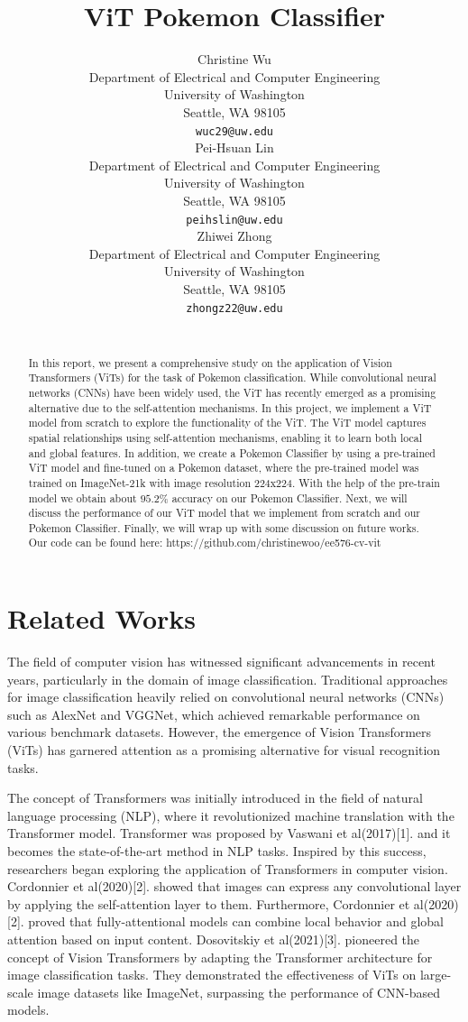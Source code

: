 \documentclass{article} %
\title{ViT Pokemon Classifier}
\author{
Christine Wu\\
Department of Electrical and Computer Engineering\\
University of Washington\\
Seattle, WA 98105 \\
\texttt{wuc29@uw.edu} \\
\And
Pei-Hsuan Lin \\
Department of Electrical and Computer Engineering\\
University of Washington\\
Seattle, WA 98105 \\
\texttt{peihslin@uw.edu} \\
\AND
Zhiwei Zhong \\
Department of Electrical and Computer Engineering\\
University of Washington\\
Seattle, WA 98105 \\
\texttt{zhongz22@uw.edu} \\
\\
}
\begin{document}
\maketitle

\begin{abstract}
In this report, we present a comprehensive study on the application of Vision Transformers 
(ViTs) for the task of Pokemon classification. While convolutional neural networks (CNNs) 
have been widely used, the ViT has recently emerged as a promising alternative due to the 
self-attention mechanisms. In this project, we implement a ViT model from scratch to explore
the functionality of the ViT. The ViT model captures spatial relationships using 
self-attention mechanisms, enabling it to learn both local and global features. 
In addition, we create a Pokemon Classifier by using a pre-trained ViT model and fine-tuned on
a Pokemon dataset, where the pre-trained model was trained on ImageNet-21k with image resolution 224x224. 
With the help of the pre-train model we obtain about $95.2\%$ accuracy on our Pokemon Classifier. Next, 
we will discuss the performance of our ViT model that we implement from scratch and our Pokemon Classifier.
Finally, we will wrap up with some discussion on future works. \\
Our code can be found here: https://github.com/christinewoo/ee576-cv-vit
\end{abstract}

\section{Related Works}
The field of computer vision has witnessed significant advancements in recent years, 
particularly in the domain of image classification. Traditional approaches for image 
classification heavily relied on convolutional neural networks (CNNs) such as AlexNet 
and VGGNet, which achieved remarkable performance on various benchmark datasets. However, 
the emergence of Vision Transformers (ViTs) has garnered attention as a promising 
alternative for visual recognition tasks.

The concept of Transformers was initially introduced in the field of natural language 
processing (NLP), where it revolutionized machine translation with the Transformer model. 
Transformer was proposed by Vaswani et al(2017)[1]. and it becomes the state-of-the-art 
method in NLP tasks. Inspired by this success, researchers began exploring the application 
of Transformers in computer vision. Cordonnier et al(2020)[2]. showed that images can express 
any convolutional layer by applying the self-attention layer to them. Furthermore, 
Cordonnier et al(2020)[2]. proved that fully-attentional models can combine local behavior 
and global attention based on input content. Dosovitskiy et al(2021)[3]. pioneered the 
concept of Vision Transformers by adapting the Transformer architecture for image 
classification tasks. They demonstrated the effectiveness of ViTs on large-scale image 
datasets like ImageNet, surpassing the performance of CNN-based models.
\end{document}
